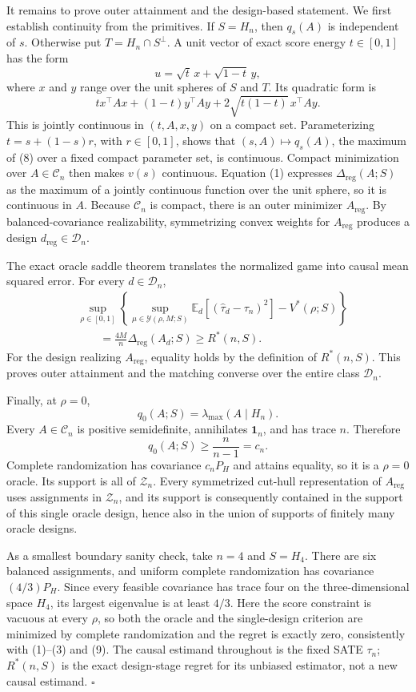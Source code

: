 It remains to prove outer attainment and the design-based statement.  We first establish continuity from the primitives.  If \(S=H_n\), then \(q_s(A)\) is independent of \(s\).  Otherwise put \(T=H_n\cap S^\perp\).  A unit vector of exact score energy \(t\in[0,1]\) has the form
\[
u=\sqrt t\,x+\sqrt{1-t}\,y,
\]
where \(x\) and \(y\) range over the unit spheres of \(S\) and \(T\).  Its quadratic form is
\[
t x^\top Ax+(1-t)y^\top Ay
+2\sqrt{t(1-t)}\,x^\top Ay.
\tag{8}
\]
This is jointly continuous in \((t,A,x,y)\) on a compact set.  Parameterizing \(t=s+(1-s)r\), with \(r\in[0,1]\), shows that \((s,A)\mapsto q_s(A)\), the maximum of (8) over a fixed compact parameter set, is continuous.  Compact minimization over \(A\in\mathcal C_n\) then makes \(v(s)\) continuous.  Equation (1) expresses \(\Delta_{\mathrm{reg}}(A;S)\) as the maximum of a jointly continuous function over the unit sphere, so it is continuous in \(A\).  Because \(\mathcal C_n\) is compact, there is an outer minimizer \(A_{\mathrm{reg}}\).  By balanced-covariance realizability, symmetrizing convex weights for \(A_{\mathrm{reg}}\) produces a design \(d_{\mathrm{reg}}\in\mathcal D_n\).

The exact oracle saddle theorem translates the normalized game into causal mean squared error.  For every \(d\in\mathcal D_n\),
\[
\begin{aligned}
&\sup_{\rho\in[0,1]}
\left\{
\sup_{\mu\in\mathcal Y(\rho,M;S)}
\mathbb E_d[(\widehat\tau_d-\tau_n)^2]
-V^*(\rho;S)
\right\}\\
&\qquad=\frac{4M}{n}\Delta_{\mathrm{reg}}(A_d;S)
\geq R^*(n,S).
\end{aligned}
\tag{9}
\]
For the design realizing \(A_{\mathrm{reg}}\), equality holds by the definition of \(R^*(n,S)\).  This proves outer attainment and the matching converse over the entire class \(\mathcal D_n\).

Finally, at \(\rho=0\),
\[
q_0(A;S)=\lambda_{\max}(A\mid H_n).
\]
Every \(A\in\mathcal C_n\) is positive semidefinite, annihilates \(\mathbf 1_n\), and has trace \(n\).  Therefore
\[
q_0(A;S)\geq\frac{n}{n-1}=c_n.
\]
Complete randomization has covariance \(c_nP_H\) and attains equality, so it is a \(\rho=0\) oracle.  Its support is all of \(\mathcal Z_n\).  Every symmetrized cut-hull representation of \(A_{\mathrm{reg}}\) uses assignments in \(\mathcal Z_n\), and its support is consequently contained in the support of this single oracle design, hence also in the union of supports of finitely many oracle designs.

As a smallest boundary sanity check, take \(n=4\) and \(S=H_4\).  There are six balanced assignments, and uniform complete randomization has covariance \((4/3)P_H\).  Since every feasible covariance has trace four on the three-dimensional space \(H_4\), its largest eigenvalue is at least \(4/3\).  Here the score constraint is vacuous at every \(\rho\), so both the oracle and the single-design criterion are minimized by complete randomization and the regret is exactly zero, consistently with (1)--(3) and (9).  The causal estimand throughout is the fixed SATE \(\tau_n\); \(R^*(n,S)\) is the exact design-stage regret for its unbiased estimator, not a new causal estimand. \(\square\)